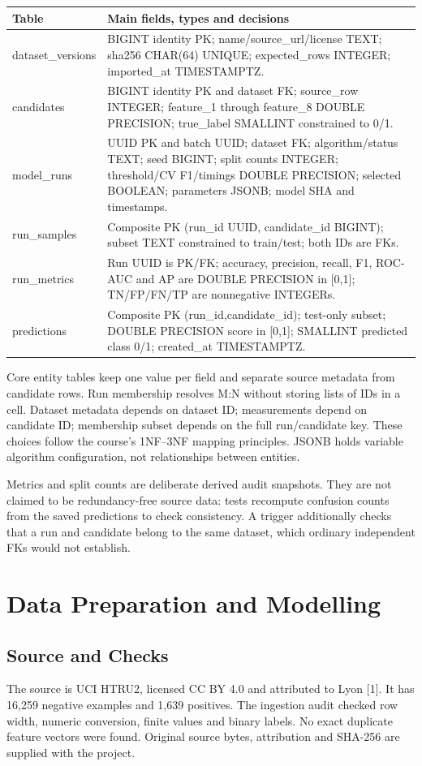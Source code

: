\documentclass[11pt,a4paper]{article}
\begin{document}
\begin{tabularx}{\linewidth}{@{}lY@{}}\toprule
\textbf{Table} & \textbf{Main fields, types and decisions}\\\midrule
 dataset\_versions & BIGINT identity PK; name/source\_url/license TEXT; sha256 CHAR(64) UNIQUE; expected\_rows INTEGER; imported\_at TIMESTAMPTZ.\\
 candidates & BIGINT identity PK and dataset FK; source\_row INTEGER; feature\_1 through feature\_8 DOUBLE PRECISION; true\_label SMALLINT constrained to 0/1.\\
 model\_runs & UUID PK and batch UUID; dataset FK; algorithm/status TEXT; seed BIGINT; split counts INTEGER; threshold/CV F1/timings DOUBLE PRECISION; selected BOOLEAN; parameters JSONB; model SHA and timestamps.\\
 run\_samples & Composite PK (run\_id UUID, candidate\_id BIGINT); subset TEXT constrained to train/test; both IDs are FKs.\\
 run\_metrics & Run UUID is PK/FK; accuracy, precision, recall, F1, ROC-AUC and AP are DOUBLE PRECISION in [0,1]; TN/FP/FN/TP are nonnegative INTEGERs.\\
 predictions & Composite PK (run\_id,candidate\_id); test-only subset; DOUBLE PRECISION score in [0,1]; SMALLINT predicted class 0/1; created\_at TIMESTAMPTZ.\\\bottomrule
\end{tabularx}

Core entity tables keep one value per field and separate source metadata from candidate rows. Run membership resolves M:N without storing lists of IDs in a cell. Dataset metadata depends on dataset ID; measurements depend on candidate ID; membership subset depends on the full run/candidate key. These choices follow the course's 1NF--3NF mapping principles. JSONB holds variable algorithm configuration, not relationships between entities.

Metrics and split counts are deliberate derived audit snapshots. They are not claimed to be redundancy-free source data: tests recompute confusion counts from the saved predictions to check consistency. A trigger additionally checks that a run and candidate belong to the same dataset, which ordinary independent FKs would not establish.

\newpage
\section{Data Preparation and Modelling}
\subsection{Source and Checks}
The source is UCI HTRU2, licensed CC BY 4.0 and attributed to Lyon [1]. It has 16,259 negative examples and 1,639 positives. The ingestion audit checked row width, numeric conversion, finite values and binary labels. No exact duplicate feature vectors were found. Original source bytes, attribution and SHA-256 are supplied with the project.
\end{document}
